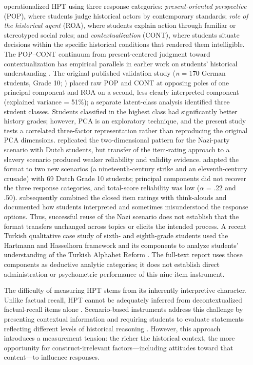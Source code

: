 \documentclass[PCJ,Unicode,screen,mode=plain]{cedram}
\begin{document}
\citet{Hartmann_Hasselhorn2008Historical} operationalized HPT using three response
categories: \emph{present-oriented perspective} (POP), where students judge
historical actors by contemporary standards; \emph{role of the
historical agent} (ROA), where students explain action through familiar
or stereotyped social roles; and
\emph{contextualization} (CONT), where students situate decisions
within the specific historical conditions that rendered them
intelligible. The POP--CONT continuum from present-centered judgment
toward contextualization has empirical parallels in earlier
work on students' historical understanding \citep{Lee_Shemilt2003A_scaffold}. The
original published validation study (\emph{n} = 170 German students,
Grade 10; \citealp{Hartmann_Hasselhorn2008Historical})
placed raw POP and CONT at opposing poles of one principal component
and ROA on a second, less clearly interpreted component (explained
variance = 51\%); a separate latent-class analysis identified three
student classes. Students classified in the highest class had
significantly better history grades; however, PCA is an exploratory
technique, and the present study tests a correlated three-factor
representation rather than reproducing the original PCA dimensions.
\citet{Huijgen_et_al2014Testing} replicated the two-dimensional pattern
for the Nazi-party scenario with Dutch students, but transfer of the
item-rating approach to a slavery scenario produced weaker reliability
and validity evidence. \citet{Wilschut_Schiphorst2019One} adapted the format
to two new scenarios (a nineteenth-century strike and an eleventh-century
crusade) with 69 Dutch Grade 10 students; principal components did not recover
the three response categories, and total-score reliability was low
($\alpha$ = .22 and .50). \citet{Huijgen_et_al2017Toward} subsequently
combined the closed item ratings with think-alouds and documented how
students interpreted and sometimes misunderstood the response options.
Thus, successful reuse of the Nazi scenario does not establish that the
format transfers unchanged across topics or elicits the intended process. A
recent Turkish qualitative case study of sixth- and eighth-grade students used
the Hartmann and Hasselhorn framework and its components to analyze students'
understanding of the Turkish Alphabet Reform \citep{Aktin_et_al2026Taking}.
The full-text report uses those components as deductive analytic categories;
it does not establish direct administration or psychometric performance of
this nine-item instrument.

The difficulty of measuring HPT stems from its inherently interpretive character. Unlike factual recall, HPT cannot be adequately inferred from decontextualized factual-recall items alone \citep{Breakstone2014Try,Smith2017Cognitive}. Scenario-based instruments address this challenge by presenting contextual information and requiring students to evaluate statements reflecting different levels of historical reasoning \citep{Hartmann_Hasselhorn2008Historical,Seixas_et_al2015A_Design}. However, this approach introduces a measurement tension: the richer the historical context, the more opportunity for construct-irrelevant factors---including attitudes toward that content---to influence responses.
\end{document}
